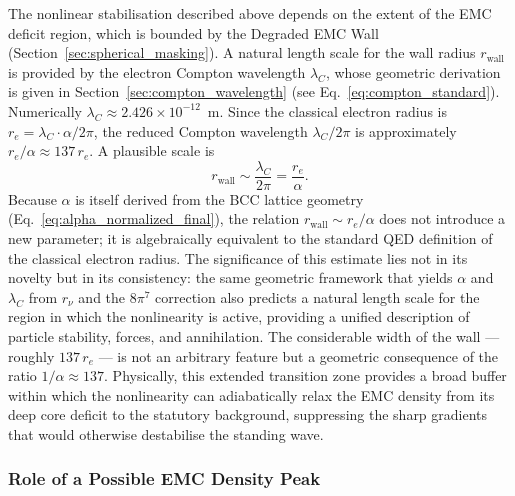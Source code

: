 \documentclass[10pt,a4paper]{article}
\begin{document}
The nonlinear stabilisation described above depends on the extent of the
EMC deficit region, which is bounded by the Degraded EMC Wall
(Section~\ref{sec:spherical_masking}).  A natural length scale for the wall
radius $r_{\text{wall}}$ is provided by the electron Compton wavelength
$\lambda_C$, whose geometric derivation is given in
Section~\ref{sec:compton_wavelength} (see Eq.~\ref{eq:compton_standard}).
Numerically $\lambda_C \approx 2.426 \times 10^{-12}$~m.  Since the
classical electron radius is $r_e = \lambda_C \cdot \alpha / 2\pi$, the
reduced Compton wavelength $\lambda_C/2\pi$ is approximately
$r_e / \alpha \approx 137\,r_e$.  A plausible scale is
\begin{equation}
	\boxed{r_{\text{wall}} \sim \frac{\lambda_C}{2\pi} = \frac{r_e}{\alpha}} .
\end{equation}
Because $\alpha$ is itself derived from the BCC lattice geometry
(Eq.~\ref{eq:alpha_normalized_final}), the relation $r_{\text{wall}} \sim
r_e/\alpha$ does not introduce a new parameter; it is algebraically
equivalent to the standard QED definition of the classical electron radius.
The significance of this estimate lies not in its novelty but in its
consistency: the same geometric framework that yields $\alpha$ and $\lambda_C$
from $r_\nu$ and the $8\pi^{7}$ correction also predicts a natural length
scale for the region in which the nonlinearity is active, providing a unified
description of particle stability, forces, and annihilation. The considerable
width of the wall --- roughly $137\,r_e$ --- is not an arbitrary feature but a
geometric consequence of the ratio $1/\alpha \approx 137$.  Physically, this
extended transition zone provides a broad buffer within which the nonlinearity
can adiabatically relax the EMC density from its deep core deficit to the
statutory background, suppressing the sharp gradients that would otherwise
destabilise the standing wave.

\subsubsection*{Role of a Possible EMC Density Peak}
\end{document}
